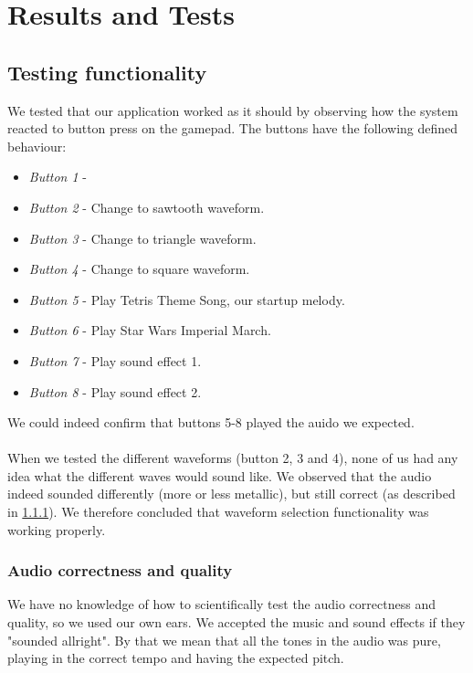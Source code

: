 \section{Results and Tests}

\subsection{Testing functionality}
We tested that our application worked as it should by observing how the system reacted to button press on the gamepad. The buttons have the following defined behaviour:
\begin{itemize}
	\item \emph{Button 1} - 
	\item \emph{Button 2} - Change to sawtooth waveform.
	\item \emph{Button 3} - Change to triangle waveform.
	\item \emph{Button 4} - Change to square waveform.
	\item \emph{Button 5} - Play Tetris Theme Song, our startup melody.
	\item \emph{Button 6} - Play Star Wars Imperial March.
	\item \emph{Button 7} - Play sound effect 1.
	\item \emph{Button 8} - Play sound effect 2.
\end{itemize}

We could indeed confirm that buttons 5-8 played the auido we expected. \\
\\
When we tested the different waveforms (button 2, 3 and 4), none of us had any idea what the different waves would sound like. We observed that the audio indeed sounded differently (more or less metallic), but still correct (as described in \ref{audio_correctness}). We therefore concluded that waveform selection functionality was working properly.

\subsubsection{Audio correctness and quality}
\label{audio_correctness}
We have no knowledge of how to scientifically test the audio correctness and quality, so we used our own ears. We accepted the music and sound effects if they "sounded allright". By that we mean that all the tones in the audio was pure, playing in the correct tempo and having the expected pitch. 

